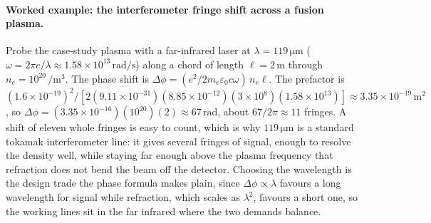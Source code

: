 \paragraph{Worked example: the interferometer fringe shift across a fusion plasma.}
Probe the case-study plasma with a far-infrared laser at $\lambda = 119\,\si{
\micro\meter}$ ($\omega = 2\pi c/\lambda \approx 1.58\times 10^{13}\,\si{
\radian\per\second}$) along a chord of length $\ell = 2\,\si{\meter}$ through
$n_e = 10^{20}\,\si{\per\meter\cubed}$. The phase shift is $\Delta\phi =
(e^{2}/2m_e\varepsilon_0 c\omega)\,n_e\ell$. The prefactor is $(1.6\times
10^{-19})^{2}/[2(9.11\times 10^{-31})(8.85\times 10^{-12})(3\times 10^{8})
(1.58\times 10^{13})] \approx 3.35\times 10^{-19}\,\si{\meter\squared}$, so
$\Delta\phi = (3.35\times 10^{-16})(10^{20})(2) \approx 67\,\si{\radian}$, about
$67/2\pi \approx 11$ fringes. A shift of eleven whole fringes is easy to count,
which is why $119\,\si{\micro\meter}$ is a standard tokamak interferometer line:
it gives several fringes of signal, enough to resolve the density well, while
staying far enough above the plasma frequency that refraction does not bend the
beam off the detector. Choosing the wavelength is the design trade the phase
formula makes plain, since $\Delta\phi\propto\lambda$ favours a long wavelength
for signal while refraction, which scales as $\lambda^{2}$, favours a short one,
so the working lines sit in the far infrared where the two demands balance.

